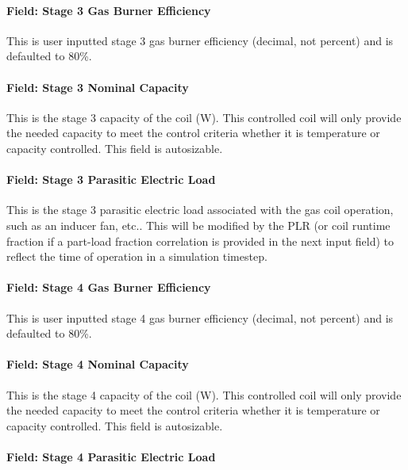 \paragraph{Field: Stage 3 Gas Burner Efficiency}\label{field-stage-3-gas-burner-efficiency}

This is user inputted stage 3 gas burner efficiency (decimal, not percent) and is defaulted to 80\%.

\paragraph{Field: Stage 3 Nominal Capacity}\label{field-stage-3-nominal-capacity-1}

This is the stage 3 capacity of the coil (W). This controlled coil will only provide the needed capacity to meet the control criteria whether it is temperature or capacity controlled. This field is autosizable.

\paragraph{Field: Stage 3 Parasitic Electric Load}\label{field-stage-3-parasitic-electric-load}

This is the stage 3 parasitic electric load associated with the gas coil operation, such as an inducer fan, etc.. This will be modified by the PLR (or coil runtime fraction if a part-load fraction correlation is provided in the next input field) to reflect the time of operation in a simulation timestep.

\paragraph{Field: Stage 4 Gas Burner Efficiency}\label{field-stage-4-gas-burner-efficiency}

This is user inputted stage 4 gas burner efficiency (decimal, not percent) and is defaulted to 80\%.

\paragraph{Field: Stage 4 Nominal Capacity}\label{field-stage-4-nominal-capacity-1}

This is the stage 4 capacity of the coil (W). This controlled coil will only provide the needed capacity to meet the control criteria whether it is temperature or capacity controlled. This field is autosizable.

\paragraph{Field: Stage 4 Parasitic Electric Load}\label{field-stage-4-parasitic-electric-load}

